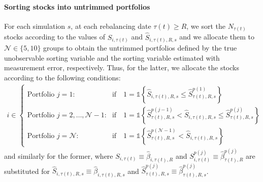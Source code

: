 \paragraph{Sorting stocks into untrimmed portfolios} For each simulation $s$, at each rebalancing date $\tau(t) \geq R$, we sort the $N_{\tau(t)}$ stocks according to the values of $S_{i,\tau(t)}$ and $\widehat{S}_{i,\tau(t),R,s}$ and we allocate them to $\mathcal{N} \in \{5, 10\}$ groups to obtain the untrimmed portfolios defined by the true unobservable sorting variable and the sorting variable estimated with measurement error, respectively. Thus, for the latter, we allocate the stocks according to the following conditions:
\begin{align*}
i \in 
\begin{cases}
    \text{Portfolio $j=1$:} & \text{if} \quad 1 = \mathds{1} \left\{ \widehat{S}_{i, \tau(t),R,s} \leq \widehat{S}_{\tau(t),R,s}^{p(1)} \right\} \\
    \text{Portfolio $j=2,\dots,\mathcal{N}-1$:} & \text{if} \quad 1 = \mathds{1} \left\{ \widehat{S}_{\tau(t),R,s}^{p(j-1)} < \widehat{S}_{i, \tau(t),R,s} \leq \widehat{S}_{\tau(t),R,s}^{p(j)} \right\} \\
    \text{Portfolio $j=\mathcal{N}$:} & \text{if} \quad 1 = \mathds{1} \left\{ \widehat{S}_{\tau(t),R,s}^{p(\mathcal{N}-1)} < \widehat{S}_{i, \tau(t),R,s} \right\} 
\end{cases}
\end{align*}
and similarly for the former, where $S_{i,\tau(t)} \equiv \widehat{\beta}_{i,\tau(t),R}$ and $S_{i,\tau(t)}^{p(j)} \equiv \widehat{\beta}_{\tau(t),R}^{p(j)}$ are substituted for $\widehat{S}_{i, \tau(t),R,s} \equiv \widehat{\beta}_{i, \tau(t),R,s}$ and $\widehat{S}_{\tau(t),R,s}^{p(j)} \equiv \widehat{\beta}_{\tau(t),R,s}^{p(j)}$.


